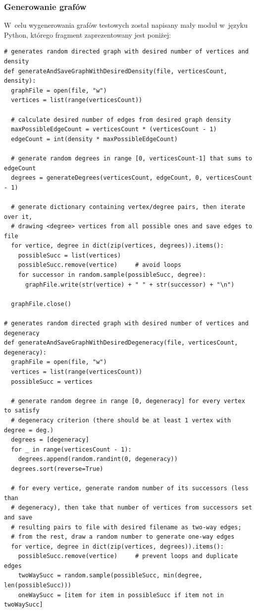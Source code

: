 \documentclass[11pt,a4paper]{article}
\begin{document}
\subsubsection{Generowanie grafów}
W~celu wygenerowania grafów testowych został napisany mały moduł w~języku Python, którego fragment zaprezentowany jest poniżej:
\begin{lstlisting}[caption = Funkcje generujące grafy dla testów wydajnościowych]
# generates random directed graph with desired number of vertices and density
def generateAndSaveGraphWithDesiredDensity(file, verticesCount, density):
  graphFile = open(file, "w")
  vertices = list(range(verticesCount))

  # calculate desired number of edges from desired graph density
  maxPossibleEdgeCount = verticesCount * (verticesCount - 1)
  edgeCount = int(density * maxPossibleEdgeCount)

  # generate random degrees in range [0, verticesCount-1] that sums to edgeCount
  degrees = generateDegrees(verticesCount, edgeCount, 0, verticesCount - 1)

  # generate dictionary containing vertex/degree pairs, then iterate over it,
  # drawing <degree> vertices from all possible ones and save edges to file
  for vertice, degree in dict(zip(vertices, degrees)).items():
    possibleSucc = list(vertices)
    possibleSucc.remove(vertice)     # avoid loops
    for successor in random.sample(possibleSucc, degree):
      graphFile.write(str(vertice) + " " + str(successor) + "\n")

  graphFile.close()

# generates random directed graph with desired number of vertices and degeneracy
def generateAndSaveGraphWithDesiredDegeneracy(file, verticesCount, degeneracy):
  graphFile = open(file, "w")
  vertices = list(range(verticesCount))
  possibleSucc = vertices

  # generate random degree in range [0, degeneracy] for every vertex to satisfy
  # degeneracy criterion (there should be at least 1 vertex with degree = deg.)
  degrees = [degeneracy]
  for _ in range(verticesCount - 1):
    degrees.append(random.randint(0, degeneracy))
  degrees.sort(reverse=True)

  # for every vertice, generate random number of its successors (less than
  # degeneracy), then take that number of vertices from successors set and save
  # resulting pairs to file with desired filename as two-way edges;
  # from the rest, draw a random number to generate one-way edges
  for vertice, degree in dict(zip(vertices, degrees)).items():
    possibleSucc.remove(vertice)     # prevent loops and duplicate edges
    twoWaySucc = random.sample(possibleSucc, min(degree, len(possibleSucc)))
    oneWaySucc = [item for item in possibleSucc if item not in twoWaySucc]


\end{lstlisting}
\end{document}
